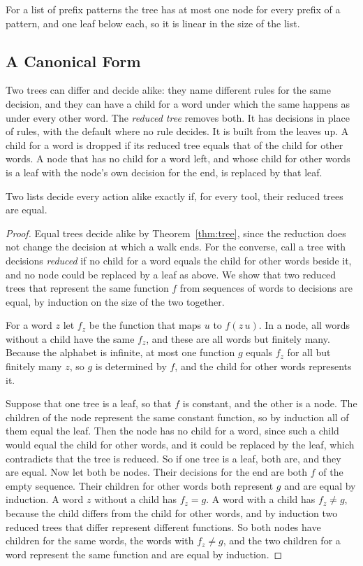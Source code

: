 \documentclass[acmsmall,nonacm,screen]{acmart}
\begin{document}
For a list of prefix patterns the tree has at most one node for every prefix of a pattern,
and one leaf below each, so it is linear in the size of the list.

\subsection{A Canonical Form}

Two trees can differ and decide alike: they name different rules for the same decision, and
they can have a child for a word under which the same happens as under every other word. The
\emph{reduced tree} removes both. It has decisions in place of rules, with the default where
no rule decides. It is built from the leaves up. A child for a word is dropped if its reduced
tree equals that of the child for other words. A node that has no child for a word left, and
whose child for other words is a leaf with the node's own decision for the end, is replaced
by that leaf.

\begin{theorem}\label{thm:canonical}
Two lists decide every action alike exactly if, for every tool, their reduced trees are
equal.
\end{theorem}

\begin{proof}
Equal trees decide alike by Theorem~\ref{thm:tree}, since the reduction does not change the
decision at which a walk ends. For the converse, call a tree with decisions \emph{reduced} if
no child for a word equals the child for other words beside it, and no node could be replaced
by a leaf as above. We show that two reduced trees that represent the same function $f$ from
sequences of words to decisions are equal, by induction on the size of the two together.

For a word $z$ let $f_z$ be the function that maps $u$ to $f(z\,u)$. In a node, all words
without a child have the same $f_z$, and these are all words but finitely many. Because the
alphabet is infinite, at most one function $g$ equals $f_z$ for all but finitely many $z$, so
$g$ is determined by $f$, and the child for other words represents it.

Suppose that one tree is a leaf, so that $f$ is constant, and the other is a node. The
children of the node represent the same constant function, so by induction all of them equal
the leaf. Then the node has no child for a word, since such a child would equal the child for
other words, and it could be replaced by the leaf, which contradicts that the tree is
reduced. So if one tree is a leaf, both are, and they are equal. Now let both be nodes. Their
decisions for the end are both $f$ of the empty sequence. Their children for other words both
represent $g$ and are equal by induction. A word $z$ without a child has $f_z = g$. A word
with a child has $f_z \ne g$, because the child differs from the child for other words, and by
induction two reduced trees that differ represent different functions. So both nodes have
children for the same words, the words with $f_z \ne g$, and the two children for a word
represent the same function and are equal by induction.
\end{proof}
\end{document}
